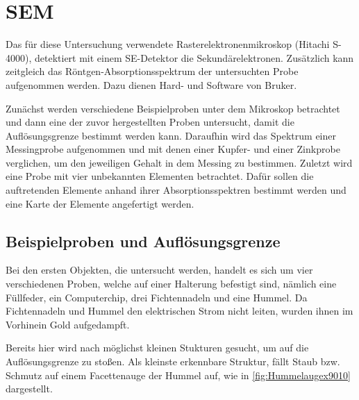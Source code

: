\section{SEM}

	Das für diese Untersuchung verwendete Rasterelektronenmikroskop (Hitachi S-4000), detektiert mit einem SE-Detektor die Sekundärelektronen.
	Zusätzlich kann zeitgleich das Röntgen-Absorptionsspektrum der untersuchten Probe aufgenommen werden.
	Dazu dienen Hard- und Software von Bruker\cite{bruker}.

	Zunächst werden verschiedene Beispielproben unter dem Mikroskop betrachtet und dann eine der zuvor hergestellten Proben untersucht, damit die Auflösungsgrenze bestimmt werden kann.
	Daraufhin wird das Spektrum einer Messingprobe aufgenommen und mit denen einer Kupfer- und einer Zinkprobe verglichen, um den jeweiligen Gehalt in dem Messing zu bestimmen.
	Zuletzt wird eine Probe mit vier unbekannten Elementen betrachtet.
	Dafür sollen die auftretenden Elemente anhand ihrer Absorptionsspektren bestimmt werden und eine Karte der Elemente angefertigt werden.

\subsection{Beispielproben und Auflösungsgrenze}

	Bei den ersten Objekten, die untersucht werden, handelt es sich um vier verschiedenen Proben, welche auf einer Halterung befestigt sind, nämlich eine Füllfeder, ein Computerchip, drei Fichtennadeln und eine Hummel.
	Da Fichtennadeln und Hummel den elektrischen Strom nicht leiten, wurden ihnen im Vorhinein Gold aufgedampft.

	Bereits hier wird nach möglichst kleinen Stukturen gesucht, um auf die Auflösungsgrenze zu stoßen.
	Als kleinste erkennbare Struktur, fällt Staub bzw. Schmutz auf einem Facettenauge der Hummel auf, wie in \cref{fig:Hummelaugex9010} dargestellt.

